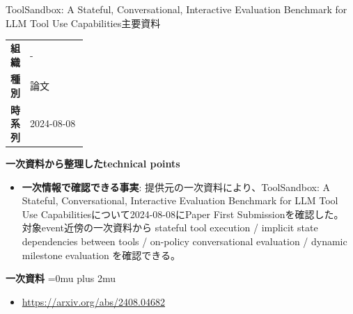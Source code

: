 \begin{technicalnote}{ToolSandbox: A Stateful, Conversational, Interactive Evaluation Benchmark for LLM Tool Use Capabilities}{主要資料}
\begingroup
\begin{tabularx}{\linewidth}{@{}>{\bfseries}p{0.22\linewidth}X@{}}
組織 & - \\
種別 & 論文 \\
時系列 & 2024-08-08 \\
\end{tabularx}
\smallskip
{\bfseries 一次資料から整理したtechnical points}
\begin{itemize}[leftmargin=1.5em,itemsep=0.35em]
\item \textbf{一次情報で確認できる事実}: 提供元の一次資料により、ToolSandbox: A Stateful, Conversational, Interactive Evaluation Benchmark for LLM Tool Use Capabilitiesについて2024-08-08にPaper First Submissionを確認した。 対象event近傍の一次資料から stateful tool execution / implicit state dependencies between tools / on-policy conversational evaluation / dynamic milestone evaluation を確認できる。
\end{itemize}
\begin{minipage}{\linewidth}
\begin{samepage}
{\bfseries 一次資料}
\begingroup\sloppy
\Urlmuskip=0mu plus 2mu\relax
\begin{itemize}[leftmargin=1.5em,itemsep=0.25em]
\item {\scriptsize\url{https://arxiv.org/abs/2408.04682}}
\end{itemize}
\endgroup
\end{samepage}
\end{minipage}
\endgroup
\end{technicalnote}
\medskip

